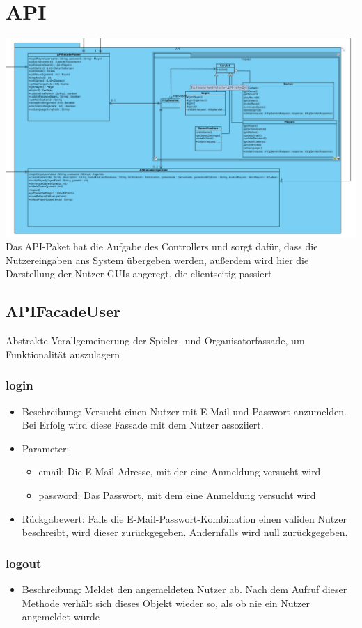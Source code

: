 \documentclass[a4paper]{scrreprt}
\begin{document}
	\section{API}
	\includegraphics[width=\textwidth]{img/api.png}
	Das API-Paket hat die Aufgabe des Controllers und sorgt dafür, dass die Nutzereingaben ans System übergeben werden, außerdem wird hier die Darstellung der Nutzer-GUIs angeregt, die clientseitig passiert
	
	\subsection{APIFacadeUser}
	Abstrakte Verallgemeinerung der Spieler- und Organisatorfassade, um Funktionalität auszulagern
	\subsubsection{login}
		\begin{itemize}
			\item Beschreibung: Versucht einen Nutzer mit E-Mail und Passwort anzumelden. Bei Erfolg wird diese Fassade mit dem Nutzer assoziiert.
			\item Parameter:
			\begin{itemize}
				\item email: Die E-Mail Adresse, mit der eine Anmeldung versucht wird
				\item password: Das Passwort, mit dem eine Anmeldung versucht wird
			\end{itemize}
			\item Rückgabewert: Falls die E-Mail-Passwort-Kombination einen validen Nutzer beschreibt, wird dieser zurückgegeben. Andernfalls wird null zurückgegeben.
		\end{itemize}
		\subsubsection{logout}
		\begin{itemize}
			\item Beschreibung: Meldet den angemeldeten Nutzer ab. Nach dem Aufruf dieser Methode verhält sich dieses Objekt wieder so, als ob nie ein Nutzer angemeldet wurde
		\end{itemize}
\end{document}
